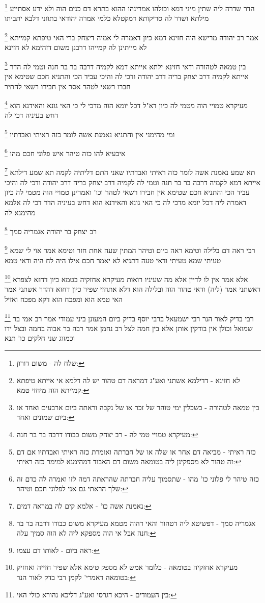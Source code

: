 \documentclass[12pt, openany]{book}
\newcommand{\footnotecomment}[1]{
	\renewcommand\thefootnote{}
	\footnote{#1}}
\newcommand{\commenta}[1]{\footnotecomment{#1}}
\begin{document}
{\commenta{שלח לה - משום דורון:}
הדר שדרה ליה שתין מיני דמא וכולהו אמרינהו ההוא בתרא דם כנים הוה ולא ידע אסתייע מילתא ושדר לה סריקותא דמקטלא כלמי אמרה יהודאי בתווני דלבא יתביתו 
\commenta{לא חזינא - דדילמא אשתני ואע"ג דמראה דם טהור יש לה דלמא אי אייתא טיפתא קמייתא הוה מיחזי טמא:}
אמר רב יהודה מרישא הוה חזינא דמא כיון דאמרה לי אמיה דיצחק ברי האי טיפתא קמייתא לא מייתינן לה קמייהו דרבנן משום דזהימא לא חזינא
\commenta{בין טמאה לטהורה - כשכלין ימי טוהר של זכר או של נקבה וראתה ביום ארבעים ואחד או ביום שמונים ואחד:}
בין טמאה לטהורה ודאי חזינא 
ילתא אייתא דמא לקמיה דרבה בר בר חנה וטמי לה הדר אייתא לקמיה דרב יצחק בריה דרב יהודה ודכי לה 
והיכי עביד הכי והתניא חכם שטימא אין חברו רשאי לטהר אסר אין חבירו רשאי להתיר 
\commenta{מעיקרא טמויי טמי לה - רב יצחק משום כבודו דרבה בר בר חנה:}
מעיקרא טמויי הוה מטמי לה כיון דא"ל דכל יומא הוה מדכי לי כי האי גונא והאידנא הוא דחש בעיניה דכי לה 
\commenta{כזה ראיתי - מביאה דם אחר או שלה או של חברתה ואומרת כזה ראיתי ואבדתיו אם דם זה טהור לא מספקינן ליה בטומאה משום דם האבוד דמהימנא למימר כזה ראיתי: }
ומי מהימני אין והתניא נאמנת אשה לומר כזה ראיתי ואבדתיו 
\commenta{כזה טיהר לי פלוני כו' מהו - שתסמוך עליה חברתה שהראתה דמה לזו ואמרה לה כדם זה שלך הראתי גם אני לפלוני חכם וטיהר:}
איבעיא להו כזה טיהר איש פלוני חכם מהו 
\commenta{נאמנת אשה כו' - אלמא קים לה במראה דמים:}
תא שמע נאמנת אשה לומר כזה ראיתי ואבדתיו שאני התם דליתיה לקמה 
תא שמע דילתא אייתא דמא לקמיה דרבה בר בר חנה וטמי לה לקמיה דרב יצחק בריה דרב יהודה ודכי לה והיכי עביד הכי והתניא חכם שטימא אין חבירו רשאי לטהר וכו' 
ואמרינן טמויי הוה מטמי לה כיון דאמרה ליה דכל יומא מדכי לה כי האי גונא והאידנא הוא דחש בעיניה הדר דכי לה אלמא מהימנא לה 
\commenta{אגמריה סמך - דפשיטא ליה דטהור והאי דהוה מטמא מעיקרא משום כבודו דרבה בר בר חנה אבל אי הוה מספקא ליה לא הוה סמיך עלה:}
רב יצחק בר יהודה אגמריה סמך 
\commenta{ראה ביום - לאותו דם עצמו:}
רבי ראה דם בלילה וטימא ראה ביום וטיהר המתין שעה אחת חזר וטימא אמר אוי לי שמא טעיתי 
שמא טעיתי ודאי טעה דתניא לא יאמר חכם אילו היה לח היה ודאי טמא
\commenta{מעיקרא אחזקיה בטומאה - כלומר אמש לא מספק טימא אלא שפיר חזייה ואחזיק בטומאה דאמרי' לקמן רבי בדק לאור הנר:}
אלא אמר אין לו לדיין אלא מה שעיניו רואות מעיקרא אחזקיה בטמא כיון דחזא לצפרא דאשתני אמר (ליה) ודאי טהור הוה ובלילה הוא דלא אתחזי שפיר כיון דחזא דהדר אשתני אמר האי טמא הוא ומפכח הוא דקא מפכח ואזיל 
\commenta{בין העמודים - היכא דגרסי ואע"ג דליכא נהורא כולי האי:}
רבי בדיק לאור הנר רבי ישמעאל ברבי יוסף בדיק ביום המעונן ביני עמודי אמר רב אמי בר שמואל וכולן אין בודקין אותן אלא בין חמה לצל רב נחמן אמר רבה בר אבוה בחמה ובצל ידו
וכמזוג שני חלקים כו' תנא}
\end{document}
